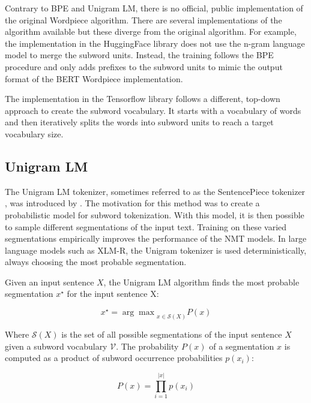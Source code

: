 Contrary to BPE and Unigram LM, there is no official, public implementation of the original Wordpiece algorithm. There are several implementations of the algorithm available but these diverge from the original algorithm. For example, the implementation in the HuggingFace library \citep{wolf_transformers_2020} does not use the n-gram language model to merge the subword units. Instead, the training follows the BPE procedure and only adds prefixes to the subword units to mimic the output format of the BERT Wordpiece implementation. 

The implementation in the Tensorflow library follows a different, top-down approach to create the subword vocabulary. It starts with a vocabulary of words and then iteratively splits the words into subword units to reach a target vocabulary size.


\subsection{Unigram LM}
\label{sec:unigram}

The Unigram LM tokenizer, sometimes referred to as the SentencePiece tokenizer \citep{kudo_sentencepiece_2018}, was introduced by \citet{kudo_subword_2018}. The motivation for this method was to create a probabilistic model for subword tokenization. With this model, it is then possible to sample different segmentations of the input text. Training on these varied segmentations empirically improves the performance of the NMT models. In large language models such as XLM-R, the Unigram tokenizer is used deterministically, always choosing the most probable segmentation.

Given an input sentence $X$, the Unigram LM algorithm finds the most probable segmentation $x^\star$ for the input sentence X:

\begin{equation}
    x^\star = {\arg\max}_{x \in \mathcal{S}(X)} P(x)
\end{equation}


Where $\mathcal{S}(X)$ is the set of all possible segmentations of the input sentence $X$ given a subword vocabulary $\mathcal{V}$. The probability $P(x)$ of a segmentation $x$ is computed as a product of subword occurrence probabilities $p(x_i)$:

\begin{equation}
    P(x) = \prod_{i=1}^{|x|} p(x_i)
\end{equation}

